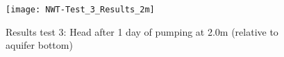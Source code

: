 \begin{figure}[H]
 \centering\texttt{[image: NWT-Test\_3\_Results\_2m]}
 \captionsetup{justification=centering}
 \caption{Results test 3: Head after 1 day of pumping at 2.0m (relative to aquifer bottom)}
 \label{fig:Test3.1_results}
\end{figure} 
%
